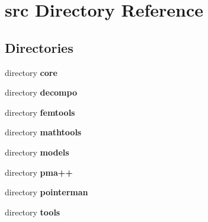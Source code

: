 \section{src Directory Reference}
\label{dir_68267d1309a1af8e8297ef4c3efbcdba}
\subsection*{Directories}
\begin{DoxyCompactItemize}
\item 
directory {\bf core}
\item 
directory {\bf decompo}
\item 
directory {\bf femtools}
\item 
directory {\bf mathtools}
\item 
directory {\bf models}
\item 
directory {\bf pma++}
\item 
directory {\bf pointerman}
\item 
directory {\bf tools}
\end{DoxyCompactItemize}
